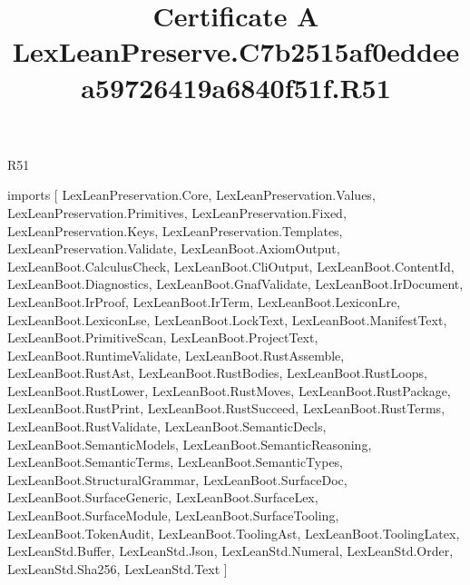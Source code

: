 \begin{lexlean}{R51}
\title{Certificate A LexLeanPreserve.C7b2515af0eddeea59726419a6840f51f.R51}
\begin{coremodule}
imports [
  LexLeanPreservation.Core,
  LexLeanPreservation.Values,
  LexLeanPreservation.Primitives,
  LexLeanPreservation.Fixed,
  LexLeanPreservation.Keys,
  LexLeanPreservation.Templates,
  LexLeanPreservation.Validate,
  LexLeanBoot.AxiomOutput,
  LexLeanBoot.CalculusCheck,
  LexLeanBoot.CliOutput,
  LexLeanBoot.ContentId,
  LexLeanBoot.Diagnostics,
  LexLeanBoot.GnafValidate,
  LexLeanBoot.IrDocument,
  LexLeanBoot.IrProof,
  LexLeanBoot.IrTerm,
  LexLeanBoot.LexiconLre,
  LexLeanBoot.LexiconLse,
  LexLeanBoot.LockText,
  LexLeanBoot.ManifestText,
  LexLeanBoot.PrimitiveScan,
  LexLeanBoot.ProjectText,
  LexLeanBoot.RuntimeValidate,
  LexLeanBoot.RustAssemble,
  LexLeanBoot.RustAst,
  LexLeanBoot.RustBodies,
  LexLeanBoot.RustLoops,
  LexLeanBoot.RustLower,
  LexLeanBoot.RustMoves,
  LexLeanBoot.RustPackage,
  LexLeanBoot.RustPrint,
  LexLeanBoot.RustSucceed,
  LexLeanBoot.RustTerms,
  LexLeanBoot.RustValidate,
  LexLeanBoot.SemanticDecls,
  LexLeanBoot.SemanticModels,
  LexLeanBoot.SemanticReasoning,
  LexLeanBoot.SemanticTerms,
  LexLeanBoot.SemanticTypes,
  LexLeanBoot.StructuralGrammar,
  LexLeanBoot.SurfaceDoc,
  LexLeanBoot.SurfaceGeneric,
  LexLeanBoot.SurfaceLex,
  LexLeanBoot.SurfaceModule,
  LexLeanBoot.SurfaceTooling,
  LexLeanBoot.TokenAudit,
  LexLeanBoot.ToolingAst,
  LexLeanBoot.ToolingLatex,
  LexLeanStd.Buffer,
  LexLeanStd.Json,
  LexLeanStd.Numeral,
  LexLeanStd.Order,
  LexLeanStd.Sha256,
  LexLeanStd.Text
]


\end{coremodule}
\end{lexlean}
